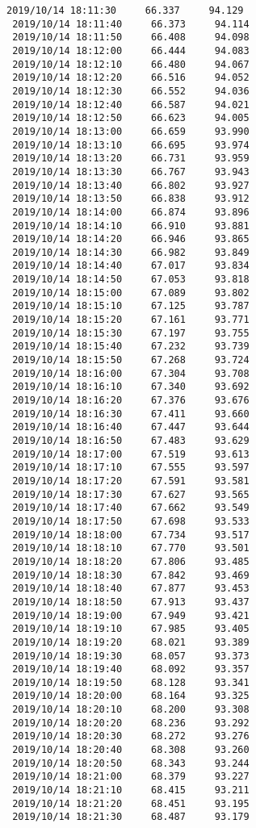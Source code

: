 \documentclass[11pt]{article}
\begin{document}
\begin{Verbatim}[commandchars=\\\{\}]
 2019/10/14 18:11:30     66.337     94.129
 2019/10/14 18:11:40     66.373     94.114
 2019/10/14 18:11:50     66.408     94.098
 2019/10/14 18:12:00     66.444     94.083
 2019/10/14 18:12:10     66.480     94.067
 2019/10/14 18:12:20     66.516     94.052
 2019/10/14 18:12:30     66.552     94.036
 2019/10/14 18:12:40     66.587     94.021
 2019/10/14 18:12:50     66.623     94.005
 2019/10/14 18:13:00     66.659     93.990
 2019/10/14 18:13:10     66.695     93.974
 2019/10/14 18:13:20     66.731     93.959
 2019/10/14 18:13:30     66.767     93.943
 2019/10/14 18:13:40     66.802     93.927
 2019/10/14 18:13:50     66.838     93.912
 2019/10/14 18:14:00     66.874     93.896
 2019/10/14 18:14:10     66.910     93.881
 2019/10/14 18:14:20     66.946     93.865
 2019/10/14 18:14:30     66.982     93.849
 2019/10/14 18:14:40     67.017     93.834
 2019/10/14 18:14:50     67.053     93.818
 2019/10/14 18:15:00     67.089     93.802
 2019/10/14 18:15:10     67.125     93.787
 2019/10/14 18:15:20     67.161     93.771
 2019/10/14 18:15:30     67.197     93.755
 2019/10/14 18:15:40     67.232     93.739
 2019/10/14 18:15:50     67.268     93.724
 2019/10/14 18:16:00     67.304     93.708
 2019/10/14 18:16:10     67.340     93.692
 2019/10/14 18:16:20     67.376     93.676
 2019/10/14 18:16:30     67.411     93.660
 2019/10/14 18:16:40     67.447     93.644
 2019/10/14 18:16:50     67.483     93.629
 2019/10/14 18:17:00     67.519     93.613
 2019/10/14 18:17:10     67.555     93.597
 2019/10/14 18:17:20     67.591     93.581
 2019/10/14 18:17:30     67.627     93.565
 2019/10/14 18:17:40     67.662     93.549
 2019/10/14 18:17:50     67.698     93.533
 2019/10/14 18:18:00     67.734     93.517
 2019/10/14 18:18:10     67.770     93.501
 2019/10/14 18:18:20     67.806     93.485
 2019/10/14 18:18:30     67.842     93.469
 2019/10/14 18:18:40     67.877     93.453
 2019/10/14 18:18:50     67.913     93.437
 2019/10/14 18:19:00     67.949     93.421
 2019/10/14 18:19:10     67.985     93.405
 2019/10/14 18:19:20     68.021     93.389
 2019/10/14 18:19:30     68.057     93.373
 2019/10/14 18:19:40     68.092     93.357
 2019/10/14 18:19:50     68.128     93.341
 2019/10/14 18:20:00     68.164     93.325
 2019/10/14 18:20:10     68.200     93.308
 2019/10/14 18:20:20     68.236     93.292
 2019/10/14 18:20:30     68.272     93.276
 2019/10/14 18:20:40     68.308     93.260
 2019/10/14 18:20:50     68.343     93.244
 2019/10/14 18:21:00     68.379     93.227
 2019/10/14 18:21:10     68.415     93.211
 2019/10/14 18:21:20     68.451     93.195
 2019/10/14 18:21:30     68.487     93.179

\end{Verbatim}
\end{document}
